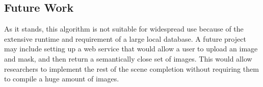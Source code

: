 \documentclass[11pt]{amsart}
\begin{document}
\subsection{Future Work}

As it stands, this algorithm is not suitable for widespread use because of the extensive runtime and requirement of a large local database. A future project may include setting up a web service that would allow a user to upload an image and mask, and then return a semantically close set of images. This would allow researchers to implement the rest of the scene completion without requiring them to compile a huge amount of images.



\end{document}
